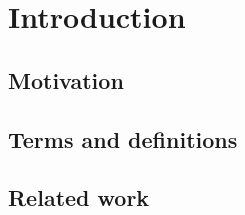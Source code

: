 \section{Introduction}\label{introduction}



\subsection{Motivation}\label{motivation}

\subsection{Terms and definitions}\label{Terms and definitions}

\subsection{Related work}\label{Related work}